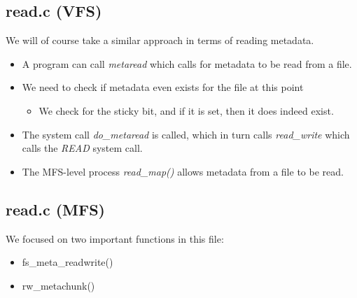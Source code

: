 \documentclass[paper=a4, fontsize=11pt]{scrartcl}
\numberwithin{equation}{section} %
\numberwithin{figure}{section} %
\numberwithin{table}{section} %
\begin{document}
	\subsection{read.c (VFS)}
	We will of course take a similar approach in terms of reading metadata.
		\begin{itemize}
			\item A program can call {\it metaread} which calls for metadata to be read from a file.
			\item We need to check if metadata even exists for the file at this point
				\begin{itemize}
					\item We check for the sticky bit, and if it is set, then it does indeed exist.
				\end{itemize}
			\item The system call {\it do\_metaread} is called, which in turn calls {\it read\_write} which calls the {\it READ} system call.
			\item The MFS-level process {\it read\_map()} allows metadata from a file to be read.
		\end{itemize}

	\subsection{read.c (MFS)}
	We focused on two important functions in this file:
		\begin{itemize}
			\item fs\_meta\_readwrite() 
			\item rw\_metachunk()
		\end{itemize}
		
\end{document}
